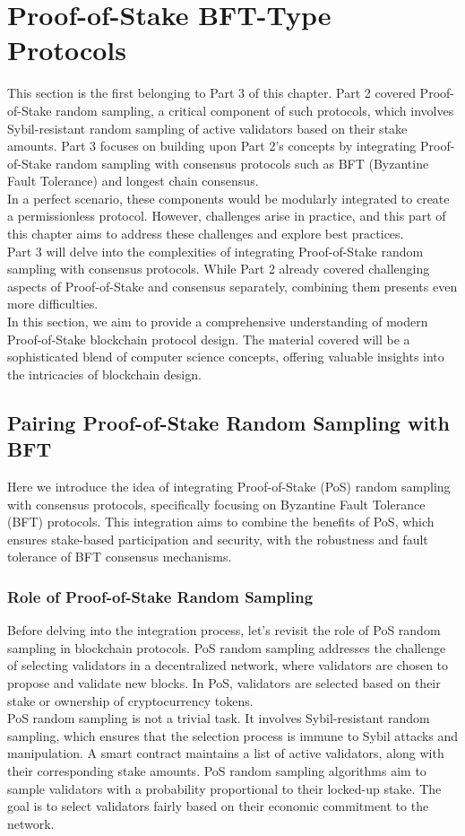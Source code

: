 \section{Proof-of-Stake BFT-Type Protocols}
This section is the first belonging to Part 3 of this chapter. Part 2 covered Proof-of-Stake random sampling, a critical component of such protocols, which involves Sybil-resistant random sampling of active validators based on their stake amounts. Part 3 focuses on building upon Part 2's concepts by integrating Proof-of-Stake random sampling with consensus protocols such as BFT (Byzantine Fault Tolerance) and longest chain consensus.\\
In a perfect scenario, these components would be modularly integrated to create a permissionless protocol. However, challenges arise in practice, and this part of this chapter aims to address these challenges and explore best practices.\\
Part 3 will delve into the complexities of integrating Proof-of-Stake random sampling with consensus protocols. While Part 2 already covered challenging aspects of Proof-of-Stake and consensus separately, combining them presents even more difficulties.\\
In this section, we aim to provide a comprehensive understanding of modern Proof-of-Stake blockchain protocol design. The material covered will be a sophisticated blend of computer science concepts, offering valuable insights into the intricacies of blockchain design.
\subsection{Pairing Proof-of-Stake Random Sampling with BFT}
Here we introduce the idea of integrating Proof-of-Stake (PoS) random sampling with consensus protocols, specifically focusing on Byzantine Fault Tolerance (BFT) protocols. This integration aims to combine the benefits of PoS, which ensures stake-based participation and security, with the robustness and fault tolerance of BFT consensus mechanisms.
\subsubsection{Role of Proof-of-Stake Random Sampling}
Before delving into the integration process, let's revisit the role of PoS random sampling in blockchain protocols. PoS random sampling addresses the challenge of selecting validators in a decentralized network, where validators are chosen to propose and validate new blocks. In PoS, validators are selected based on their stake or ownership of cryptocurrency tokens.\\
PoS random sampling is not a trivial task. It involves Sybil-resistant random sampling, which ensures that the selection process is immune to Sybil attacks and manipulation. A smart contract maintains a list of active validators, along with their corresponding stake amounts. PoS random sampling algorithms aim to sample validators with a probability proportional to their locked-up stake. The goal is to select validators fairly based on their economic commitment to the network.


